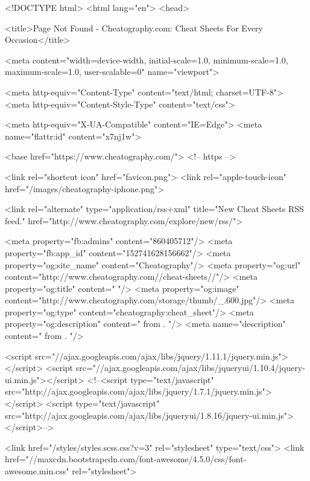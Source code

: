 <!DOCTYPE html>
<html lang="en">
    <head>

        <title>Page Not Found - Cheatography.com: Cheat Sheets For Every Occasion</title>

        <meta content="width=device-width, initial-scale=1.0, minimum-scale=1.0, maximum-scale=1.0, user-scalable=0" name="viewport">

        <meta http-equiv="Content-Type" content="text/html; charset=UTF-8">
        <meta http-equiv="Content-Style-Type" content="text/css">

        <meta http-equiv="X-UA-Compatible" content="IE=Edge">
        <meta name="flattr:id" content="x7nj1w">

        <base href="https://www.cheatography.com/"> <!-- https -->

        <link rel="shortcut icon" href="favicon.png">
        <link rel="apple-touch-icon" href="/images/cheatography-iphone.png">

        <link rel="alternate" type="application/rss+xml" title="New Cheat Sheets RSS feed." href="http://www.cheatography.com/explore/new/rss/">


        
        
                    <meta property="fb:admins" content="860405712"/>
            <meta property="fb:app_id" content="152741628156662"/>
            <meta property="og:site_name" content="Cheatography"/>
            <meta property="og:url" content="http://www.cheatography.com//cheat-sheets//"/>
            <meta property="og:title" content=" "/>
            <meta property="og:image" content="http://www.cheatography.com/storage/thumb/_.600.jpg"/>
            <meta property="og:type" content="cheatography:cheat_sheet"/>
            <meta property="og:description" content="  from . "/>
            <meta name="description" content="  from . "/>
        
        <script src="//ajax.googleapis.com/ajax/libs/jquery/1.11.1/jquery.min.js"></script>
        <script src="//ajax.googleapis.com/ajax/libs/jqueryui/1.10.4/jquery-ui.min.js"></script>
        <!--<script type="text/javascript" src="http://ajax.googleapis.com/ajax/libs/jquery/1.7.1/jquery.min.js"></script>
        <script type="text/javascript" src="http://ajax.googleapis.com/ajax/libs/jqueryui/1.8.16/jquery-ui.min.js"></script>-->

        <link href="/styles/styles.scss.css?v=3" rel="stylesheet" type="text/css">
        <link href="//maxcdn.bootstrapcdn.com/font-awesome/4.5.0/css/font-awesome.min.css" rel="stylesheet">

